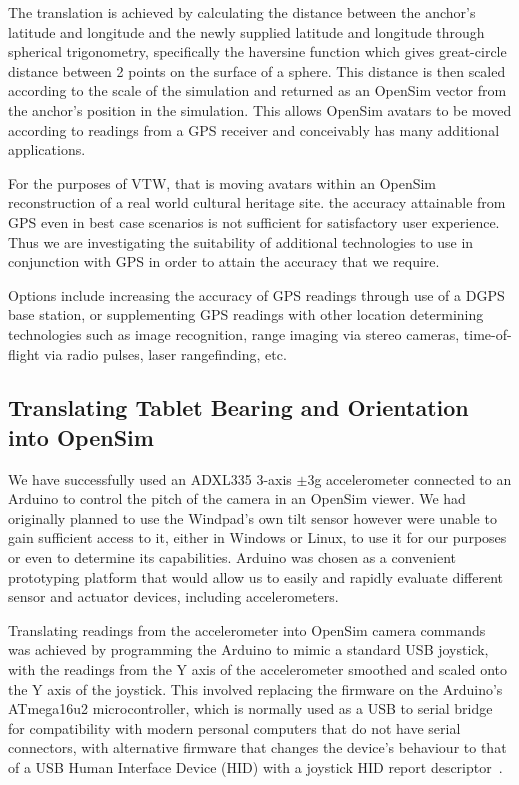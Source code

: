 \documentclass[conference,a4paper]{IEEEtran}
\begin{document}
The translation is achieved by calculating the distance between the anchor's latitude and longitude and the newly supplied latitude and longitude through spherical trigonometry, specifically the haversine function which gives great-circle distance between 2 points on the surface of a sphere. This distance is then scaled according to the scale of the simulation and returned as an OpenSim vector from the anchor's position in the simulation. This allows OpenSim avatars to be moved according to readings from a GPS receiver and conceivably has many additional applications.

For the purposes of VTW, that is moving avatars within an OpenSim reconstruction of a real world cultural heritage site. the accuracy attainable from GPS even in best case scenarios is not sufficient for satisfactory user experience. Thus we are investigating the suitability of additional technologies to use in conjunction with GPS in order to attain the accuracy that we require.

Options include increasing the accuracy of GPS readings through use of a DGPS base station, or supplementing GPS readings with other location determining technologies such as image recognition, range imaging via stereo cameras, time-of-flight via radio pulses, laser rangefinding, etc.

\subsection{Translating Tablet Bearing and Orientation into OpenSim}
We have successfully used an ADXL335 3-axis $\pm$3g accelerometer connected to an Arduino to control the pitch of the camera in an OpenSim viewer. We had originally planned to use the Windpad's own tilt sensor however were unable to gain sufficient access to it, either in Windows or Linux, to use it for our purposes or even to determine its capabilities. Arduino was chosen as a convenient prototyping platform that would allow us to easily and rapidly evaluate different sensor and actuator devices, including accelerometers.

Translating readings from the accelerometer into OpenSim camera commands was achieved by programming the Arduino to mimic a standard USB joystick, with the readings from the Y axis of the accelerometer smoothed and scaled onto the Y axis of the joystick. This involved replacing the firmware on the Arduino's ATmega16u2 microcontroller, which is normally used as a USB to serial bridge for compatibility with modern personal computers that do not have serial connectors, with alternative firmware that changes the device's behaviour to that of a USB Human Interface Device (HID) with a joystick HID report descriptor~\cite{Camera}.
\end{document}
